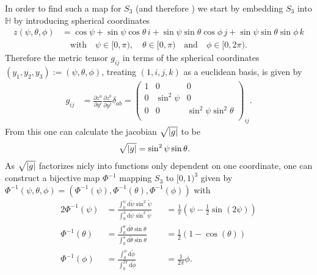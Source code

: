 In order to find such a map for $S_3$ (and therefore \SUTwo) we start by embedding $S_3$ into $\mathbb{H}$ by introducing spherical coordinates
\begin{align*}
 z (\psi, \theta, \phi) & =
 \cos \psi + \sin \psi \cos \theta \, i + \sin \psi \sin \theta \cos \phi \, j + \sin \psi \sin \theta \sin \phi \, k                                \\
                        & \quad \textrm{with} \quad \psi \in [0,\pi), \quad \theta \in [0,\pi) \quad \textrm{and} \quad \phi \in [0,2\pi) \textrm{.}
\end{align*}
Therefore the metric tensor $g_{ij}$ in terms of the spherical coordinates $(y_1, y_2, y_3) := (\psi, \theta, \phi)$, treating $(1,i,j,k)$ as a euclidean basis, is given by
\begin{align*}
 g_{ij} & = \frac{\partial z^a}{\partial y^i} \frac{\partial z^b}{\partial y^j} \delta_{ab} = \begin{pmatrix}
  1 & 0           & 0                         \\
  0 & \sin^2 \psi & 0                         \\
  0 & 0           & \sin^2 \psi \sin^2 \theta \\
 \end{pmatrix}_{ij} \textrm{.}
\end{align*}
From this one can calculate the jacobian $\sqrt{\abs{g}}$ to be
\begin{align*}
 \sqrt{\abs{g}} & = \sin^2 \psi \sin \theta \textrm{.}
\end{align*}
As $\sqrt{\abs{g}}$ factorizes nicly into functions only dependent on one coordinate, one can construct a bijective map $\Phi^{-1}$ mapping $S_3$ to $[0,1)^3$ given by $\Phi^{-1}(\psi,\theta,\phi) = \left(\Phi^{-1} (\psi), \Phi^{-1}(\theta), \Phi^{-1} (\phi) \right)$ with
\begin{alignat*}{2}
 \Phi^{-1} (\psi)   & = \frac{\int_0^{\psi}\textrm{d}\tilde{\psi} \sin^2 \tilde{\psi}}{\int_0^\pi \textrm{d} \tilde{\psi} \sin^2 \tilde{\psi}} &  & = \frac{1}{\pi}  \left( \psi - \frac{1}{2} \sin( 2 \psi) \right) \\
 \Phi^{-1} (\theta) & = \frac{\int_0^{\theta}\textrm{d}\tilde{\theta} \sin \theta}{\int_0^\pi \textrm{d}\tilde{\theta} \sin \theta}            &  & = \frac{1}{2} \left( 1-\cos(\theta) \right)                      \\
 \Phi^{-1} (\phi)   & = \frac{\int_0^{\phi}\textrm{d}\tilde{\phi} }{\int_0^{2 \pi} \textrm{d} \tilde{\phi}}                                    &  & = \frac{1}{2 \pi} \phi \textrm{.}
\end{alignat*}
